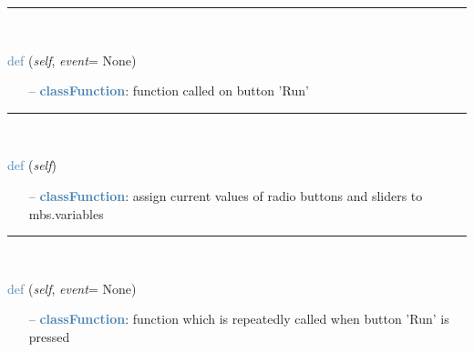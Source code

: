 \begin{itemize}[leftmargin=1.4cm]
\begin{itemize}[leftmargin=1.4cm]
\begin{itemize}[leftmargin=0.5cm]
\begin{itemize}[leftmargin=1.4cm]
\begin{itemize}[leftmargin=1.4cm]
\begin{itemize}[leftmargin=0.5cm]
\begin{itemize}[leftmargin=1.4cm]
\begin{itemize}[leftmargin=0.5cm]
\begin{itemize}[leftmargin=1.4cm]
\begin{itemize}[leftmargin=1.4cm]
\begin{itemize}[leftmargin=0.7cm]
\vspace{12pt}\end{itemize}
%
\noindent\rule{8cm}{0.75pt}\vspace{1pt} \\ 
\begin{flushleft}
\noindent \textcolor{steelblue}{def {\bf {}}}\label{sec:interactive:InteractiveDialog:StartSimulation}
({\it self}, {\it event}= None)
\end{flushleft}
\setlength{\itemindent}{0.7cm}
\begin{itemize}[leftmargin=0.7cm]
\item[--]\textcolor{steelblue}{\bf classFunction}: function called on button 'Run'
\vspace{12pt}\end{itemize}
%
\noindent\rule{8cm}{0.75pt}\vspace{1pt} \\ 
\begin{flushleft}
\noindent \textcolor{steelblue}{def {\bf {}}}\label{sec:interactive:InteractiveDialog:ProcessWidgetStates}
({\it self})
\end{flushleft}
\setlength{\itemindent}{0.7cm}
\begin{itemize}[leftmargin=0.7cm]
\item[--]\textcolor{steelblue}{\bf classFunction}: assign current values of radio buttons and sliders to mbs.variables
\vspace{12pt}\end{itemize}
%
\noindent\rule{8cm}{0.75pt}\vspace{1pt} \\ 
\begin{flushleft}
\noindent \textcolor{steelblue}{def {\bf {}}}\label{sec:interactive:InteractiveDialog:ContinuousRunFunction}
({\it self}, {\it event}= None)
\end{flushleft}
\setlength{\itemindent}{0.7cm}
\begin{itemize}[leftmargin=0.7cm]
\item[--]\textcolor{steelblue}{\bf classFunction}: function which is repeatedly called when button 'Run' is pressed
\vspace{12pt}\end{itemize}

\end{itemize}
\end{itemize}
\end{itemize}
\end{itemize}
\end{itemize}
\end{itemize}
\end{itemize}
\end{itemize}
\end{itemize}
\end{itemize}
